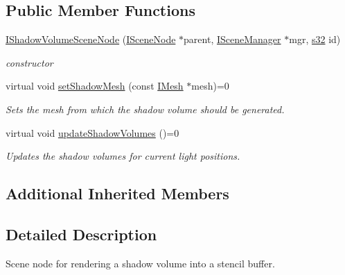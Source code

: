 \subsection*{Public Member Functions}
\begin{DoxyCompactItemize}
\item 
\mbox{\label{classirr_1_1scene_1_1IShadowVolumeSceneNode_aa2d604d5c4ec96b053c7f711a1ade25e}} 
\hyperlink{classirr_1_1scene_1_1IShadowVolumeSceneNode_aa2d604d5c4ec96b053c7f711a1ade25e}{I\+Shadow\+Volume\+Scene\+Node} (\hyperlink{classirr_1_1scene_1_1ISceneNode}{I\+Scene\+Node} $\ast$parent, \hyperlink{classirr_1_1scene_1_1ISceneManager}{I\+Scene\+Manager} $\ast$mgr, \hyperlink{namespaceirr_ac66849b7a6ed16e30ebede579f9b47c6}{s32} id)
\begin{DoxyCompactList}\small\item\em constructor \end{DoxyCompactList}\item 
virtual void \hyperlink{classirr_1_1scene_1_1IShadowVolumeSceneNode_a69af3aa713c909106bacccdbab01184d}{set\+Shadow\+Mesh} (const \hyperlink{classirr_1_1scene_1_1IMesh}{I\+Mesh} $\ast$mesh)=0
\begin{DoxyCompactList}\small\item\em Sets the mesh from which the shadow volume should be generated. \end{DoxyCompactList}\item 
\mbox{\label{classirr_1_1scene_1_1IShadowVolumeSceneNode_a3fa8470e9aa103a449eb365bfff4ef13}} 
virtual void \hyperlink{classirr_1_1scene_1_1IShadowVolumeSceneNode_a3fa8470e9aa103a449eb365bfff4ef13}{update\+Shadow\+Volumes} ()=0
\begin{DoxyCompactList}\small\item\em Updates the shadow volumes for current light positions. \end{DoxyCompactList}\end{DoxyCompactItemize}
\subsection*{Additional Inherited Members}


\subsection{Detailed Description}
Scene node for rendering a shadow volume into a stencil buffer. 

